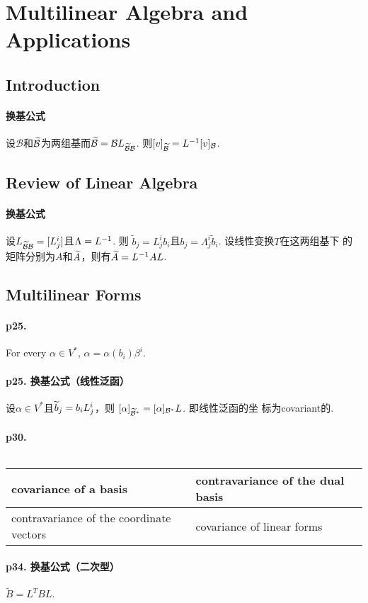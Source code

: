 \section{Multilinear Algebra and Applications}

\subsection{Introduction}
  \paragraph{换基公式}
    设$\mathcal{B}$和$\widetilde{\mathcal{B}}$为两组基而$\widetilde{\mathcal{B}}=
    \mathcal{B}L_{\widetilde{\mathcal{B}}\mathcal{B}}$. 则$[v]_{\widetilde{
    \mathcal{B}}}=L^{-1}[v]_{\mathcal{B}}$.

\subsection{Review of Linear Algebra}
  \paragraph{换基公式}
    设$L_{\widetilde{\mathcal{B}}\mathcal{B}}=[L^i_j]$且$\Lambda=L^{-1}$. 则
    $\tilde{b}_j=L^i_jb_i$且$b_j=\Lambda_j^i\tilde{b}_i$. 设线性变换$T$在这两组基下
    的矩阵分别为$A$和$\widetilde{A}$，则有$\widetilde{A}=L^{-1} AL$. 

\subsection{Multilinear Forms}
  \paragraph{p25. }
    For every $\alpha\in V^*$, $\alpha=\alpha(b_i)\beta^i$.

  \paragraph{p25. 换基公式（线性泛函）}
    设$\alpha\in V^*$且$\widetilde{b}_j = b_iL^i_j$，则
    $[\alpha]_{\widetilde{\mathcal{B}}^*}=[\alpha]_{\mathcal{B}^*}L$. 即线性泛函的坐
    标为covariant的.

  \paragraph{p30.}
    $\,$\\
    \begin{tabular}{|l|l|}
      \hline
      covariance of a basis                    
      & contravariance of the dual basis  \\ \hline
      contravariance of the coordinate vectors 
      & covariance of linear forms \\ \hline
    \end{tabular}
  
  \paragraph{p34. 换基公式（二次型）}
    $\tilde{B} = L^TBL$.



